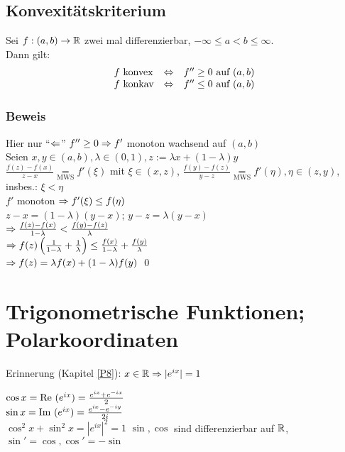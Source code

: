 \section{Konvexitätskriterium}\label{11.18}
Sei $f: (a,b) \to \mathbb{R}$ zwei mal differenzierbar, $-\infty \le a < b \le \infty$.\\
Dann gilt:
$$\begin{array}{l l l} f \text{ konvex} & \Leftrightarrow & f'' \ge 0 \text{ auf } (a,b) \\ f \text{ konkav} & \Leftrightarrow & f'' \le 0 \text{ auf } (a,b) \end{array}$$

\subsection*{Beweis}
Hier nur "`$\Leftarrow$"' $f'' \ge 0 \Rightarrow f'$ monoton wachsend auf $(a,b)$\\
Seien $x,y \in (a,b), \lambda \in (0,1), z := \lambda x + (1-\lambda)y$\\
$\frac{f(z)-f(x)}{z-x} \underset{\text{MWS}}{=} f'(\xi)$ mit $\xi \in (x,z)$, $\frac{f(y)-f(z)}{y-z} \underset{\text{MWS}}{=} f'(\eta), \eta \in (z,y)$, insbes.: $\xi < \eta$\\
$f'$ monoton $\Rightarrow f'(\xi) \le f(\eta)$\\
$z-x = (1-\lambda)(y-x)$; $y-z = \lambda(y-x)$\\
$\Rightarrow \frac{f(z)-f(x)}{1-\lambda} < \frac{f(y)-f(z)}{\lambda}$\\
$\Rightarrow f(z) \left(\frac{1}{1-\lambda} + \frac{1}{\lambda}\right) \le \frac{f(x)}{1-\lambda} + \frac{f(y)}{\lambda}$\\
$\Rightarrow f(z) = \lambda f(x) + (1-\lambda) f(y)$ \qed

\chapter{Trigonometrische Funktionen; Polarkoordinaten}\label{P12}
Erinnerung (Kapitel \ref{P8}): $x \in \mathbb{R} \Rightarrow |e^{ix}| = 1$\nl
{}\nl
$\cos x = \text{Re }(e^{ix}) = \frac{e^{ix}+e^{-ix}}{2}$\\
$\sin x = \text{Im }(e^{ix}) = \frac{e^{ix}-e^{-iy}}{2i}$\\
$\cos^2 x + \sin^2 x = |e^{ix}|^2 = 1$\nl
$\sin, \cos$ sind differenzierbar auf $\mathbb{R}$, $\sin'=\cos, \cos'=-\sin$


